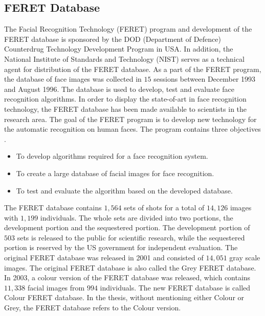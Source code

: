 \subsection{FERET Database}
The Facial Recognition Technology (\mbox{FERET}) program and development of the FERET database is sponsored by the DOD (Department of Defence) Counterdrug Technology Development Program in USA. In addition, the National Institute of Standards and Technology (NIST) serves as a technical agent for distribution of the FERET database. As a part of the FERET program, the database of face images was collected in $15$ sessions between December 1993 and August 1996. The database is used to develop, test and evaluate face recognition algorithms. In order to display the state-of-art in face recognition technology, the FERET database has been made available to scientists in the research area.
The goal of the FERET program is to develop new technology for the automatic recognition on human faces. The program contains three objectives \cite{Phillips1996}.
\begin{itemize}
\item To develop algorithms required for a face recognition system. 
\item To create a large database of facial images for face recognition. 
\item To test and evaluate the algorithm based on the developed database.
\end{itemize}

The \mbox{FERET} database contains $1,564$ sets of shots for a total of $14,126$ images with $1,199$ individuals. The whole sets are divided into two portions, the development portion and the sequestered portion. The development portion of $503$ sets is released to the public for scientific research, while the sequestered portion is reserved by the US government for independent evaluation. The original \mbox{FERET} database was released in 2001 and consisted of $14,051$ gray scale images. The original \mbox{FERET} database is also called the Grey \mbox{FERET} database. In 2003, a colour version of the \mbox{FERET} database was released, which contains $11,338$ facial images from $994$ individuals. The new \mbox{FERET} database is called Colour \mbox{FERET} database. In the thesis, without mentioning either Colour or Grey, the \mbox{FERET} database refers to the Colour version.

